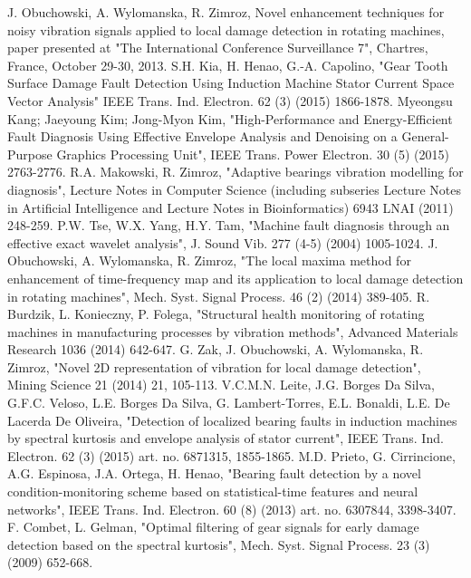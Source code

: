 \documentclass[11pt]{article} %
\begin{document}
\begin{thebibliography}{00}
 J. Obuchowski, A. Wylomanska, R. Zimroz, Novel enhancement techniques for noisy vibration signals applied to local damage detection in rotating machines, paper presented at "The International Conference Surveillance 7", Chartres, France, October 29-30, 2013.
 S.H. Kia, H. Henao, G.-A. Capolino, "Gear Tooth Surface Damage Fault Detection Using Induction Machine Stator Current Space Vector Analysis" IEEE Trans. Ind. Electron. 62 (3) (2015) 1866-1878.
 Myeongsu Kang; Jaeyoung Kim; Jong-Myon Kim, "High-Performance and Energy-Efficient Fault Diagnosis Using Effective Envelope Analysis and Denoising on a General-Purpose Graphics Processing Unit", IEEE Trans. Power Electron. 30 (5) (2015) 2763-2776.
 R.A. Makowski, R. Zimroz, "Adaptive bearings vibration modelling for diagnosis", Lecture Notes in Computer Science (including subseries Lecture Notes in Artificial Intelligence and Lecture Notes in Bioinformatics) 6943 LNAI (2011) 248-259.
  P.W. Tse, W.X. Yang, H.Y. Tam, "Machine fault diagnosis through an effective exact wavelet analysis", J. Sound Vib. 277 (4-5) (2004) 1005-1024.
 J. Obuchowski, A. Wylomanska, R. Zimroz, "The local maxima method for enhancement of time-frequency map and its application to local damage detection in rotating machines", Mech. Syst. Signal Process. 46 (2) (2014) 389-405.
 R. Burdzik, L. Konieczny, P. Folega, "Structural health monitoring of rotating machines in manufacturing processes by vibration methods", Advanced Materials Research 1036 (2014) 642-647.
 G. Zak, J. Obuchowski, A. Wylomanska, R. Zimroz, "Novel 2D representation of vibration for local damage detection", Mining Science 21 (2014) 21, 105-113.
 V.C.M.N. Leite, J.G. Borges Da Silva, G.F.C. Veloso, L.E. Borges Da Silva, G. Lambert-Torres, E.L. Bonaldi, L.E. De Lacerda De Oliveira, "Detection of localized bearing faults in induction machines by spectral kurtosis and envelope analysis of stator current", IEEE Trans. Ind. Electron. 62 (3) (2015) art. no. 6871315, 1855-1865. 
 M.D. Prieto, G. Cirrincione, A.G. Espinosa, J.A. Ortega, H. Henao, "Bearing fault detection by a novel condition-monitoring scheme based on statistical-time features and neural networks", IEEE Trans. Ind. Electron. 60 (8) (2013) art. no. 6307844, 3398-3407. 
 F. Combet, L. Gelman, "Optimal filtering of gear signals for early damage detection based on the spectral kurtosis", Mech. Syst. Signal Process. 23 (3) (2009) 652-668.

\end{thebibliography}
\end{document}

